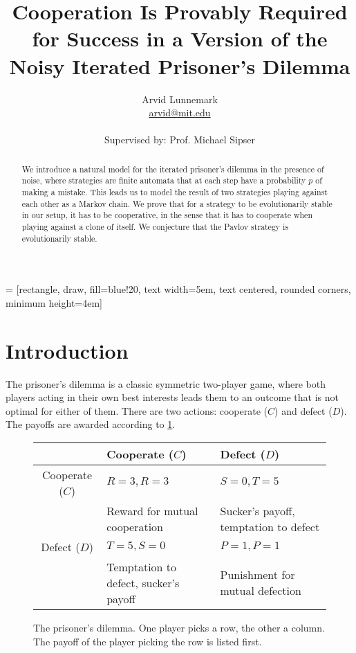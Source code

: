 \documentclass[12pt]{article}
\title{\Large \textbf{Cooperation Is Provably Required for Success in a Version of the Noisy Iterated Prisoner's Dilemma}}
\author{Arvid Lunnemark \\
\url{arvid@mit.edu}\\ \\
Supervised by: Prof. Michael Sipser}
\theoremstyle{definition}
\theoremstyle{remark}
\begin{document}
 = [rectangle, draw, fill=blue!20, 
    text width=5em, text centered, rounded corners, minimum height=4em]

\maketitle

\begin{abstract}
    We introduce a natural model for the iterated prisoner's dilemma in the presence of noise, where strategies are finite automata that at each step have a probability $p$ of making a mistake. This leads us to model the result of two strategies playing against each other as a Markov chain. We prove that for a strategy to be evolutionarily stable in our setup, it has to be cooperative, in the sense that it has to cooperate when playing against a clone of itself. We conjecture that the Pavlov strategy is evolutionarily stable.
\end{abstract}

\section{Introduction}

The prisoner's dilemma is a classic symmetric two-player game, where both players acting in their own best interests leads them to an outcome that is not optimal for either of them. There are two actions: cooperate ($C$) and defect ($D$). The payoffs are awarded according to \cref{fig:prisonersdilemmatable}.

\begin{figure}
    \centering
    \begin{tabularx}{0.8\textwidth}{|c | Y| Y|}
         & Cooperate ($C$) & Defect ($D$) \\ \hline
        Cooperate ($C$) & $R=3 , R=3$ & $S=0, T=5$ \\
         & Reward for mutual cooperation & Sucker's payoff, temptation to defect \\ \hline
        Defect ($D$) & $T=5, S=0$ & $P=1, P=1$ \\
        & Temptation to defect, sucker's payoff & Punishment for mutual defection \\ \hline
    \end{tabularx}
    \caption{The prisoner's dilemma. One player picks a row, the other a column. The payoff of the player picking the row is listed first.}
    \label{fig:prisonersdilemmatable}
\end{figure}
\end{document}
